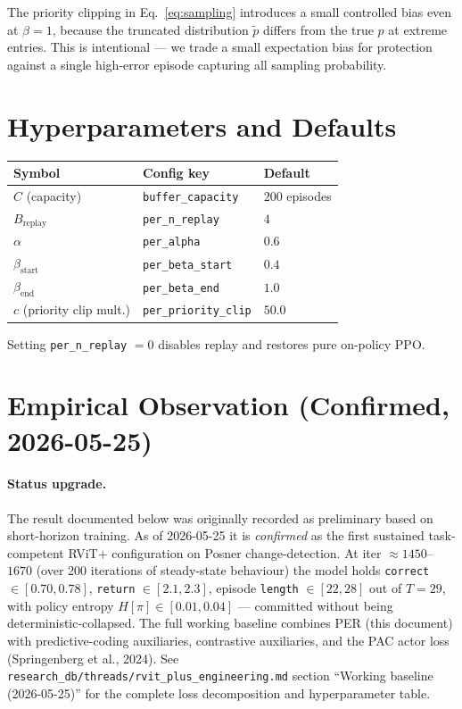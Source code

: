 \documentclass[11pt]{article}
\begin{document}
The priority clipping in Eq.~\eqref{eq:sampling} introduces a small
controlled bias even at $\beta = 1$, because the truncated
distribution $\tilde p$ differs from the true $p$ at extreme entries.
This is intentional — we trade a small expectation bias for protection
against a single high-error episode capturing all sampling
probability.

\section{Hyperparameters and Defaults}

\begin{center}
\begin{tabular}{lll}
\toprule
Symbol & Config key & Default \\
\midrule
$C$ (capacity)             & \texttt{buffer\_capacity}    & $200$ episodes \\
$B_{\text{replay}}$        & \texttt{per\_n\_replay}      & $4$ \\
$\alpha$                   & \texttt{per\_alpha}          & $0.6$ \\
$\beta_{\text{start}}$     & \texttt{per\_beta\_start}    & $0.4$ \\
$\beta_{\text{end}}$       & \texttt{per\_beta\_end}      & $1.0$ \\
$c$ (priority clip mult.)  & \texttt{per\_priority\_clip} & $50.0$ \\
\bottomrule
\end{tabular}
\end{center}

\noindent Setting \texttt{per\_n\_replay} $= 0$ disables replay and
restores pure on-policy PPO.

\section{Empirical Observation (Confirmed, 2026-05-25)}

\paragraph{Status upgrade.} The result documented below was originally
recorded as preliminary based on short-horizon training. As of
2026-05-25 it is \emph{confirmed} as the first sustained task-competent
RViT$+$ configuration on Posner change-detection. At iter
$\approx 1450$--$1670$ (over 200 iterations of steady-state behaviour)
the model holds \texttt{correct} $\in [0.70, 0.78]$, \texttt{return}
$\in [2.1, 2.3]$, episode \texttt{length} $\in [22, 28]$ out of
$T = 29$, with policy entropy $H[\pi] \in [0.01, 0.04]$ — committed
without being deterministic-collapsed. The full working baseline
combines PER (this document) with predictive-coding auxiliaries,
contrastive auxiliaries, and the PAC actor loss (Springenberg et
al., 2024). See
\texttt{research\_db/threads/rvit\_plus\_engineering.md} section
``Working baseline (2026-05-25)'' for the complete loss decomposition
and hyperparameter table.
\end{document}
